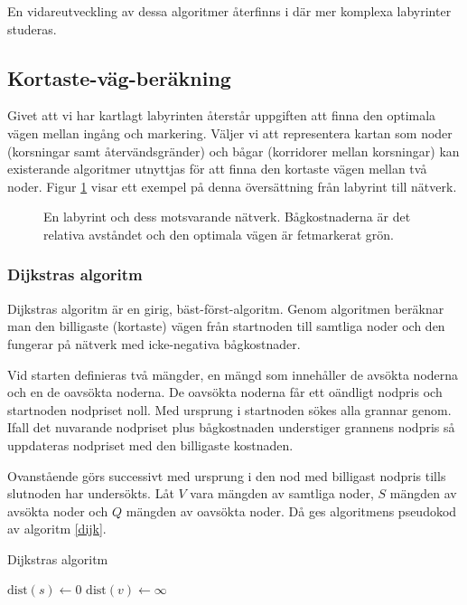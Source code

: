 \documentclass[11pt]{article}
\begin{document}
\begin{flushleft}
En vidareutveckling av dessa algoritmer återfinns i \cite{flood} där mer komplexa labyrinter studeras.

\subsection{Kortaste-väg-beräkning}
\label{optimalvag}
Givet att vi har kartlagt labyrinten återstår uppgiften att finna den optimala vägen mellan ingång och markering. Väljer vi att representera kartan som noder (korsningar samt återvändsgränder) och bågar (korridorer mellan korsningar) kan existerande algoritmer utnyttjas för att finna den kortaste vägen mellan två noder. Figur \ref{labToGraph} visar ett exempel på denna översättning från labyrint till nätverk. 

\begin{figure}[htbp]
\centering
\noindent\resizebox{.6\linewidth}{!}{
	}
	\caption{En labyrint och dess motsvarande nätverk. Bågkostnaderna är det relativa avståndet och den optimala vägen är fetmarkerat grön.\label{labToGraph}}	
\end{figure}

\subsubsection{Dijkstras algoritm}
Dijkstras algoritm är en girig, bäst-först-algoritm. Genom algoritmen beräknar man den billigaste (kortaste) vägen från startnoden till samtliga noder och den fungerar på nätverk med icke-negativa bågkostnader. 

Vid starten definieras två mängder, en mängd som innehåller de avsökta noderna och en de oavsökta noderna. De oavsökta noderna får ett oändligt nodpris och startnoden nodpriset noll. Med ursprung i startnoden sökes alla grannar genom. Ifall det nuvarande nodpriset plus bågkostnaden understiger grannens nodpris så uppdateras nodpriset med den billigaste kostnaden.

Ovanstående görs successivt med ursprung i den nod med billigast nodpris tills slutnoden har undersökts. Låt $V$ vara mängden av samtliga noder, $S$ mängden av avsökta noder och $Q$ mängden av oavsökta noder. Då ges algoritmens pseudokod av algoritm \ref{dijk}.

\begin{algorithm}
	\caption{Dijkstras algoritm} \label{dijk}
	\begin{algorithmic}[1]
			\State $\textrm{dist}(s) \gets 0$
				\State $\textrm{dist}(v) \gets \infty$
			\EndFor
			

\end{algorithmic}
\end{algorithm}
\end{flushleft}
\end{document}
